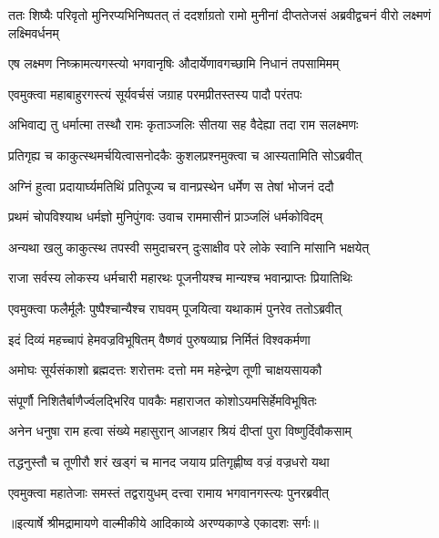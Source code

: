 \threelineshloka
{ततः शिष्यैः परिवृतो मुनिरप्यभिनिष्पतत्}
{तं ददर्शाग्रतो रामो मुनीनां दीप्ततेजसं}
{अब्रवीद्वचनं वीरो लक्ष्मणं लक्ष्मिवर्धनम्} %

\twolineshloka
{एष लक्ष्मण निष्क्रामत्यगस्त्यो भगवानृषिः}
{औदार्येणावगच्छामि निधानं तपसामिमम्} %

\twolineshloka
{एवमुक्त्वा महाबाहुरगस्त्यं सूर्यवर्चसं}
{जग्राह परमप्रीतस्तस्य पादौ परंतपः} %

\twolineshloka
{अभिवाद्य तु धर्मात्मा तस्थौ रामः कृताञ्जलिः}
{सीतया सह वैदेह्या तदा राम सलक्ष्मणः} %

\twolineshloka
{प्रतिगृह्य च काकुत्स्थमर्चयित्वासनोदकैः}
{कुशलप्रश्नमुक्त्वा च आस्यतामिति सोऽब्रवीत्} %

\twolineshloka
{अग्निं हुत्वा प्रदायार्घ्यमतिथिं प्रतिपूज्य च}
{वानप्रस्थेन धर्मेण स तेषां भोजनं ददौ} %

\twolineshloka
{प्रथमं चोपविश्याथ धर्मज्ञो मुनिपुंगवः}
{उवाच राममासीनं प्राञ्जलिं धर्मकोविदम्} %

\twolineshloka
{अन्यथा खलु काकुत्स्थ तपस्वी समुदाचरन्}
{दुःसाक्षीव परे लोके स्वानि मांसानि भक्षयेत्} %

\twolineshloka
{राजा सर्वस्य लोकस्य धर्मचारी महारथः}
{पूजनीयश्च मान्यश्च भवान्प्राप्तः प्रियातिथिः} %

\twolineshloka
{एवमुक्त्वा फलैर्मूलैः पुष्पैश्चान्यैश्च राघवम्}
{पूजयित्वा यथाकामं पुनरेव ततोऽब्रवीत्} %

\twolineshloka
{इदं दिव्यं महच्चापं हेमवज्रविभूषितम्}
{वैष्णवं पुरुषव्याघ्र निर्मितं विश्वकर्मणा} %

\twolineshloka
{अमोघः सूर्यसंकाशो ब्रह्मदत्तः शरोत्तमः}
{दत्तो मम महेन्द्रेण तूणी चाक्षयसायकौ} %

\twolineshloka
{संपूर्णौ निशितैर्बाणैर्ज्वलद्भिरिव पावकैः}
{महाराजत कोशोऽयमसिर्हेमविभूषितः} %

\twolineshloka
{अनेन धनुषा राम हत्वा संख्ये महासुरान्}
{आजहार श्रियं दीप्तां पुरा विष्णुर्दिवौकसाम्} %

\twolineshloka
{तद्धनुस्तौ च तूणीरौ शरं खड्गं च मानद}
{जयाय प्रतिगृह्णीष्व वज्रं वज्रधरो यथा} %

\twolineshloka
{एवमुक्त्वा महातेजाः समस्तं तद्वरायुधम्}
{दत्त्वा रामाय भगवानगस्त्यः पुनरब्रवीत्} %


{॥इत्यार्षे श्रीमद्रामायणे वाल्मीकीये आदिकाव्ये अरण्यकाण्डे एकादशः सर्गः॥}


